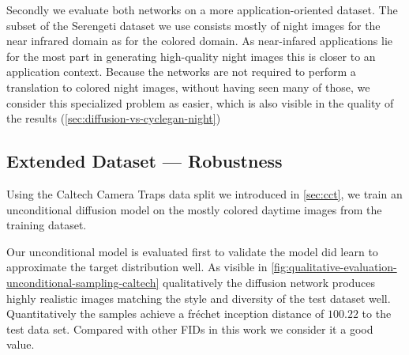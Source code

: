 Secondly we evaluate both networks on a more application-oriented dataset.
The subset of the Serengeti dataset we use consists mostly of night images for the near infrared domain as for the colored domain.
As near-infared applications lie for the most part in generating high-quality night images this is closer to an application context.
Because the networks are not required to perform a translation to colored night images, without having seen many of those, we consider
this specialized problem as easier, which is also visible in the quality of the results (\autoref{sec:diffusion-vs-cyclegan-night})

\subsection{Extended Dataset --- Robustness}
\label{sec:diffusion-vs-cyclegan-day}
Using the Caltech Camera Traps data split we introduced in \autoref{sec:cct},
we train an unconditional diffusion model on the mostly colored daytime images from the training dataset.

Our unconditional model is evaluated first to validate the model did learn to approximate the target distribution well.
As visible in \autoref{fig:qualitative-evaluation-unconditional-sampling-caltech} qualitatively the diffusion network
produces highly realistic images matching the style and diversity of the test dataset well.
Quantitatively the samples achieve a fréchet inception distance of $100.22$ to the test data set.
Compared with other FIDs in this work we consider it a good value.

